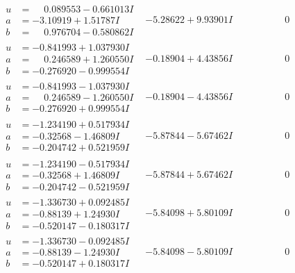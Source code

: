\documentclass[1p]{elsarticle_modified}
\theoremstyle{definition}
\begin{document}
$$\begin{array}{c|c|c}
\begin{aligned}
u &= \phantom{-}0.089553 - 0.661013 I \\
a &= -3.10919 + 1.51787 I \\
b &= \phantom{-}0.976704 - 0.580862 I\end{aligned}
 & -5.28622 + 9.93901 I & \phantom{-0.000000 } 0 \\ \hline\begin{aligned}
u &= -0.841993 + 1.037930 I \\
a &= \phantom{-}0.246589 + 1.260550 I \\
b &= -0.276920 - 0.999554 I\end{aligned}
 & -0.18904 + 4.43856 I & \phantom{-0.000000 } 0 \\ \hline\begin{aligned}
u &= -0.841993 - 1.037930 I \\
a &= \phantom{-}0.246589 - 1.260550 I \\
b &= -0.276920 + 0.999554 I\end{aligned}
 & -0.18904 - 4.43856 I & \phantom{-0.000000 } 0 \\ \hline\begin{aligned}
u &= -1.234190 + 0.517934 I \\
a &= -0.32568 - 1.46809 I \\
b &= -0.204742 + 0.521959 I\end{aligned}
 & -5.87844 - 5.67462 I & \phantom{-0.000000 } 0 \\ \hline\begin{aligned}
u &= -1.234190 - 0.517934 I \\
a &= -0.32568 + 1.46809 I \\
b &= -0.204742 - 0.521959 I\end{aligned}
 & -5.87844 + 5.67462 I & \phantom{-0.000000 } 0 \\ \hline\begin{aligned}
u &= -1.336730 + 0.092485 I \\
a &= -0.88139 + 1.24930 I \\
b &= -0.520147 - 0.180317 I\end{aligned}
 & -5.84098 + 5.80109 I & \phantom{-0.000000 } 0 \\ \hline\begin{aligned}
u &= -1.336730 - 0.092485 I \\
a &= -0.88139 - 1.24930 I \\
b &= -0.520147 + 0.180317 I\end{aligned}
 & -5.84098 - 5.80109 I & \phantom{-0.000000 } 0 \\ \hline\begin{aligned}

\end{aligned}
\end{array}$$
\end{document}
